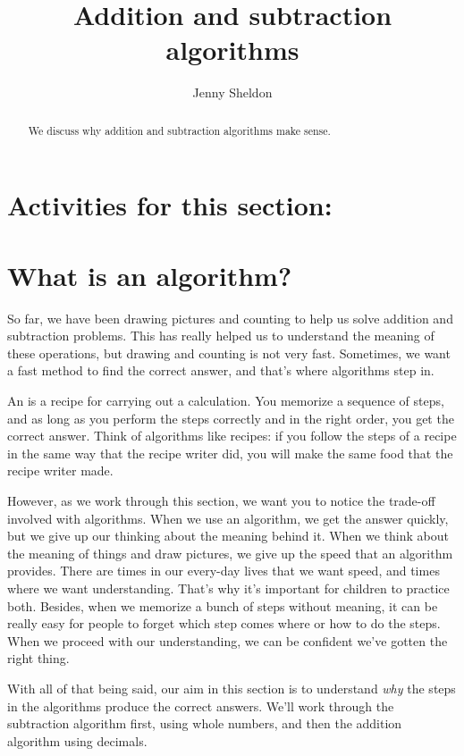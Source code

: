 \documentclass{ximera}
\title{Addition and subtraction algorithms}
\author{Jenny Sheldon}
\begin{document}
\begin{abstract}
We discuss why addition and subtraction algorithms make sense.
\end{abstract}
\maketitle

\section{Activities for this section:} 

\section{What is an algorithm?}

So far, we have been drawing pictures and counting to help us solve addition and subtraction problems. This has really helped us to understand the meaning of these operations, but drawing and counting is not very fast. Sometimes, we want a fast method to find the correct answer, and that's where algorithms step in.

An  is a recipe for carrying out a calculation. You memorize a sequence of steps, and as long as you perform the steps correctly and in the right order, you get the correct answer. Think of algorithms like recipes: if you follow the steps of a recipe in the same way that the recipe writer did, you will make the same food that the recipe writer made.

However, as we work through this section, we want you to notice the trade-off involved with algorithms. When we use an algorithm, we get the answer quickly, but we give up our thinking about the meaning behind it. When we think about the meaning of things and draw pictures, we give up the speed that an algorithm provides. There are times in our every-day lives that we want speed, and times where we want understanding. That's why it's important for children to practice both. Besides, when we memorize a bunch of steps without meaning, it can be really easy for people to forget which step comes where or how to do the steps. When we proceed with our understanding, we can be confident we've gotten the right thing.

With all of that being said, our aim in this section is to understand \emph{why} the steps in the algorithms produce the correct answers. We'll work through the subtraction algorithm first, using whole numbers, and then the addition algorithm using decimals.
\end{document}
